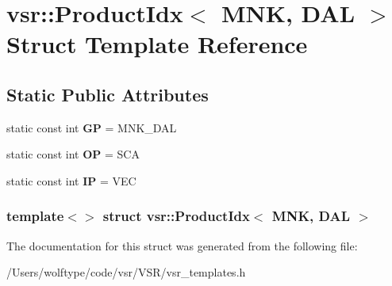 \hypertarget{structvsr_1_1_product_idx_3_01_m_n_k_00_01_d_a_l_01_4}{\section{vsr\-:\-:Product\-Idx$<$ M\-N\-K, D\-A\-L $>$ Struct Template Reference}
\label{structvsr_1_1_product_idx_3_01_m_n_k_00_01_d_a_l_01_4}
}
\subsection*{Static Public Attributes}
\begin{DoxyCompactItemize}
\item 
\hypertarget{structvsr_1_1_product_idx_3_01_m_n_k_00_01_d_a_l_01_4_a36f6f4cb089605410482944be4793592}{static const int {\bfseries G\-P} = M\-N\-K\-\_\-\-D\-A\-L}\label{structvsr_1_1_product_idx_3_01_m_n_k_00_01_d_a_l_01_4_a36f6f4cb089605410482944be4793592}

\item 
\hypertarget{structvsr_1_1_product_idx_3_01_m_n_k_00_01_d_a_l_01_4_a19b21f594c7f5f54274410f59ef44a73}{static const int {\bfseries O\-P} = S\-C\-A}\label{structvsr_1_1_product_idx_3_01_m_n_k_00_01_d_a_l_01_4_a19b21f594c7f5f54274410f59ef44a73}

\item 
\hypertarget{structvsr_1_1_product_idx_3_01_m_n_k_00_01_d_a_l_01_4_a521bc601ea1ef03c089a8786161e1996}{static const int {\bfseries I\-P} = V\-E\-C}\label{structvsr_1_1_product_idx_3_01_m_n_k_00_01_d_a_l_01_4_a521bc601ea1ef03c089a8786161e1996}

\end{DoxyCompactItemize}
\subsubsection*{template$<$$>$ struct vsr\-::\-Product\-Idx$<$ M\-N\-K, D\-A\-L $>$}



The documentation for this struct was generated from the following file\-:\begin{DoxyCompactItemize}
\item 
/\-Users/wolftype/code/vsr/\-V\-S\-R/vsr\-\_\-templates.\-h\end{DoxyCompactItemize}
